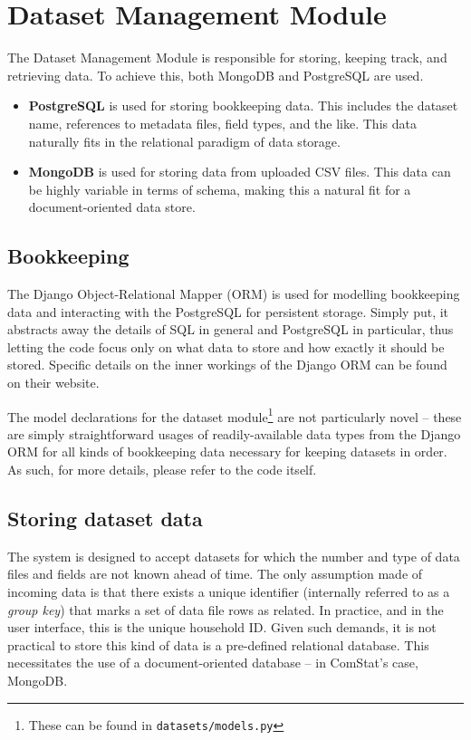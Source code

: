 
\section{Dataset Management Module}

The Dataset Management Module is responsible for storing, keeping track, and retrieving data. To achieve this, both MongoDB and PostgreSQL are used.

\begin{itemize}
\item \textbf{PostgreSQL} is used for storing bookkeeping data. This includes the dataset name, references to metadata files, field types, and the like. This data naturally fits in the relational paradigm of data storage.
\item \textbf{MongoDB} is used for storing data from uploaded CSV files. This data can be highly variable in terms of schema, making this a natural fit for a document-oriented data store.
\end{itemize}


\subsection{Bookkeeping}

The Django Object-Relational Mapper (ORM) is used for modelling bookkeeping data and interacting with the PostgreSQL for persistent storage. Simply put, it abstracts away the details of SQL in general and PostgreSQL in particular, thus letting the code focus only on what data to store and how exactly it should be stored. Specific details on the inner workings of the Django ORM can be found on their website.

The model declarations for the dataset module\footnote{These can be found in \texttt{datasets/models.py}} are not particularly novel -- these are simply straightforward usages of readily-available data types from the Django ORM for all kinds of bookkeeping data necessary for keeping datasets in order. As such, for more details, please refer to the code itself.

\subsection{Storing dataset data}

The system is designed to accept datasets for which the number and type of data files and fields are not known ahead of time. The only assumption made of incoming data is that there exists a unique identifier (internally referred to as a \emph{group key}) that marks a set of data file rows as related. In practice, and in the user interface, this is the unique household ID. Given such demands, it is not practical to store this kind of data is a pre-defined relational database. This necessitates the use of a document-oriented database -- in ComStat's case, MongoDB.

